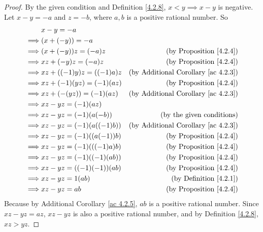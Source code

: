 \begin{proof}
By the given condition and Definition \ref{4.2.8}, \(x < y \implies x - y\) is negative.
Let \(x - y = -a\) and \(z = -b\), where \(a, b\) is a positive rational number.
So
\begin{align*}
& x - y = -a \\
\implies & (x + (-y)) = -a \\
\implies & (x + (-y))z = (-a)z & \text{(by Proposition \ref{4.2.4})} \\
\implies & xz + (-y)z = (-a)z & \text{(by Proposition \ref{4.2.4})} \\
\implies & xz + ((-1)y)z = ((-1)a)z & \text{(by Additional Corollary \ref{ac 4.2.3})} \\
\implies & xz + (-1)(yz) = (-1)(az) & \text{(by Proposition \ref{4.2.4})} \\
\implies & xz + (-(yz)) = (-1)(az) & \text{(by Additional Corollary \ref{ac 4.2.3})} \\
\implies & xz - yz = (-1)(az) \\
\implies & xz - yz = (-1)(a(-b)) & \text{(by the given conditions)} \\
\implies & xz - yz = (-1)(a((-1)b)) & \text{(by Additional Corollary \ref{ac 4.2.3})} \\
\implies & xz - yz = (-1)((a(-1))b) & \text{(by Proposition \ref{4.2.4})} \\
\implies & xz - yz = (-1)(((-1)a)b) & \text{(by Proposition \ref{4.2.4})} \\
\implies & xz - yz = (-1)((-1)(ab)) & \text{(by Proposition \ref{4.2.4})} \\
\implies & xz - yz = ((-1)(-1))(ab) & \text{(by Proposition \ref{4.2.4})} \\
\implies & xz - yz = 1(ab) & \text{(by Definition \ref{4.2.1})} \\
\implies & xz - yz = ab & \text{(by Proposition \ref{4.2.4})} \\
\end{align*}
Because by Additional Corollary \ref{ac 4.2.5}, \(ab\) is a positive rational number.
Since \(xz - yz = az\), \(xz - yz\) is also a positive rational number, and by Definition \ref{4.2.8}, \(xz > yz\).
\end{proof}